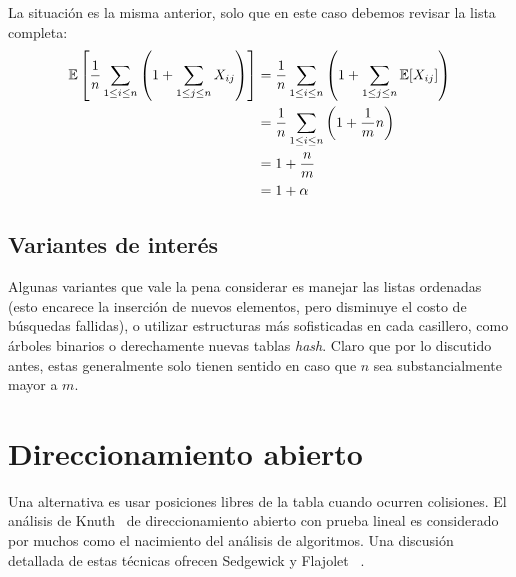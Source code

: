   La situación es la misma anterior,
  solo que en este caso debemos revisar la lista completa:
  \begin{align}
    \operatorname{\mathbb{E}}\left[
          \frac{1}{n} \sum_{1 \le i \le n}
                        \left(
                          1 + \sum_{1 \le j \le n} X_{i j}
                        \right)
        \right]
      &=	   \frac{1}{n} \sum_{1 \le i \le n}
                          \left(
                            1 + \sum_{1 \le j \le n} \operatorname{\mathbb{E}}[X_{i j}]
                          \right) \notag \\
      &=	   \frac{1}{n} \sum_{1 \le i \le n}
                          \left(
                            1 + \frac{1}{m} n
                          \right) \notag \\
      &=	   1 + \frac{n}{m} \notag \\
      &=	   1 + \alpha
         \label{eq:hashing-closed-failure}
  \end{align}

\subsection{Variantes de interés}
\label{sec:hash-closed-variants}

  Algunas variantes que vale la pena considerar es manejar las listas ordenadas
  (esto encarece la inserción de nuevos elementos,
   pero disminuye el costo de búsquedas fallidas),
  o utilizar estructuras más sofisticadas en cada casillero,
  como árboles binarios
  o derechamente nuevas tablas \emph{\foreignlanguage{english}{hash}}.
  Claro que por lo discutido antes,
  estas generalmente solo tienen sentido
  en caso que \(n\) sea substancialmente mayor a \(m\).

\section{Direccionamiento abierto}
\label{sec:hash-open}

  Una alternativa es usar posiciones libres de la tabla
  cuando ocurren colisiones.
  El análisis de Knuth~%
    \cite{knuth63:_notes_open_addressing}
  de direccionamiento abierto con prueba lineal es considerado por muchos
  como el nacimiento del análisis de algoritmos.
  Una discusión detallada de estas técnicas ofrecen Sedgewick y Flajolet~%
    \cite[capítulo~8]{sedgewick13:_introd_anal_algor}.

